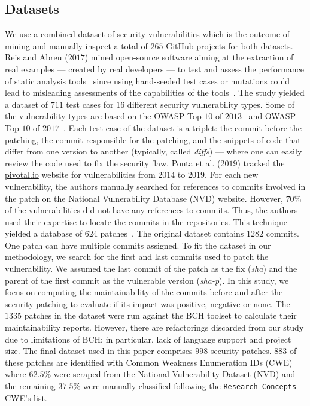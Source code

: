 \documentclass[10pt,conference]{IEEEtran}
\begin{document}
\subsection{Datasets}
%
We use a combined dataset of security vulnerabilities which is 
the outcome of mining and manually inspect a total of $265$ GitHub projects for both
datasets. Reis and Abreu 
($2017$) mined open-source
software aiming at the extraction of real examples --- created by real
developers --- to test and assess the performance of static analysis tools~\cite{Reis:2017:IJSSE} since
using hand-seeded test cases or mutations could lead to misleading assessments
of the capabilities of the tools~\cite{just2014mutants}. The study yielded a
dataset of $711$ test cases for $16$ different security vulnerability types. Some of the vulnerability types
are based on the OWASP Top $10$ of $2013$~\cite{oswap:2013} and OWASP Top $10$ of
$2017$~\cite{oswap:2017}. Each test case of the
dataset is a triplet: the commit before the patching, the commit responsible
for the patching, and the snippets of code that differ from one version to
another (typically, called \textit{diffs}) --- where one can easily review the
code used to fix the security flaw. 
%
Ponta et al. ($2019$) tracked the \url{pivotal.io} website for vulnerabilities 
from $2014$ to $2019$. For each new vulnerability, the authors manually searched 
for references to commits involved in the patch on the National Vulnerability Database (NVD) website. However, $70\%$
of the vulnerabilities did not have any references to commits. Thus, the authors
used their expertise to locate the commits in the repositories. This technique 
yielded a database of $624$ patches~\cite{10.1109/MSR.2019.00064}. The original 
dataset contains $1282$ commits. One patch can have multiple commits assigned.
To fit the dataset in our methodology, we search for the first and last commits
used to patch the vulnerability. We assumed the last commit of the patch as 
the fix (\emph{sha}) and the parent of the first commit as the vulnerable version 
(\emph{sha-p}).
%
In this study, we focus on computing the
maintainability of the commits before and after the security patching to
evaluate if its impact was positive, negative or none.
The $1335$ patches in the dataset were run against the BCH toolset to
calculate their maintainability reports. However, there are refactorings
discarded from our study due to limitations of BCH: in particular, lack of
language support and project size. The final dataset used in this paper comprises
$998$ security patches. $883$ of these patches are identified with Common Weakness
Enumeration IDs (CWE) where $62.5\%$ were scraped from the National Vulnerability Dataset (NVD) and the remaining $37.5\%$ were manually classified following the \texttt{Research Concepts} CWE's list.
\end{document}
